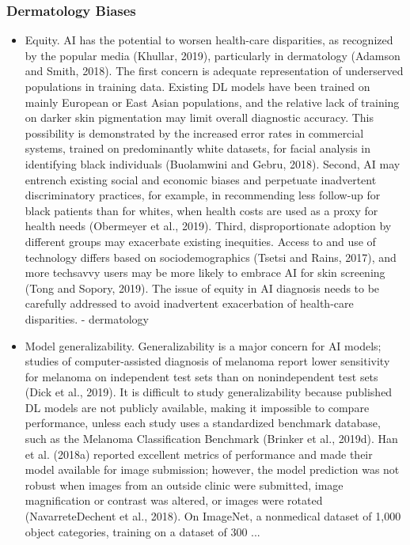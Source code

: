 \documentclass[12pt, a4paper, oneside]{book}   	%
\renewcommand{\paragraph}[1]{%
	\subsubsection*{#1}%
}
\begin{document}
			\paragraph{Dermatology Biases}
			\begin{itemize}
				\item Equity. \gls{AI} has the potential to worsen health-care disparities, as recognized by the popular media (Khullar, 2019), particularly in dermatology (Adamson and Smith, 2018). The first concern is adequate representation of underserved populations in training data. Existing DL models have been trained on mainly European or East Asian populations, and the relative lack of training on darker skin pigmentation may limit overall diagnostic accuracy. This possibility is demonstrated by the increased error rates in commercial systems, trained on predominantly white datasets, for facial analysis in identifying black individuals (Buolamwini and Gebru, 2018). Second, \gls{AI} may entrench existing social and economic biases and perpetuate inadvertent discriminatory practices, for example, in recommending less follow-up for black patients than for whites, when health costs are used as a proxy for health needs (Obermeyer et al., 2019). Third, disproportionate adoption by different groups may exacerbate existing inequities. Access to and use of technology differs based on sociodemographics (Tsetsi and Rains, 2017), and more techsavvy users may be more likely to embrace \gls{AI} for skin screening (Tong and Sopory, 2019). The issue of equity in \gls{AI} diagnosis needs to be carefully addressed to avoid inadvertent exacerbation of health-care disparities. \autocite{Young_2020} - dermatology
				\item Model generalizability. Generalizability is a major concern for \gls{AI} models; studies of computer-assisted diagnosis of melanoma report lower sensitivity for melanoma on independent test sets than on nonindependent test sets (Dick et al., 2019). It is difficult to study generalizability because published DL models are not publicly available, making it impossible to compare performance, unless each study uses a standardized benchmark database, such as the Melanoma Classification Benchmark (Brinker et al., 2019d). Han et al. (2018a) reported excellent metrics of performance and made their model available for image submission; however, the model prediction was not robust when images from an outside clinic were submitted, image magnification or contrast was altered, or images were rotated (NavarreteDechent et al., 2018). On ImageNet, a nonmedical dataset of 1,000 object categories, training on a dataset of 300 ... \autocite{Young_2020}
			\end{itemize}
\end{document}
